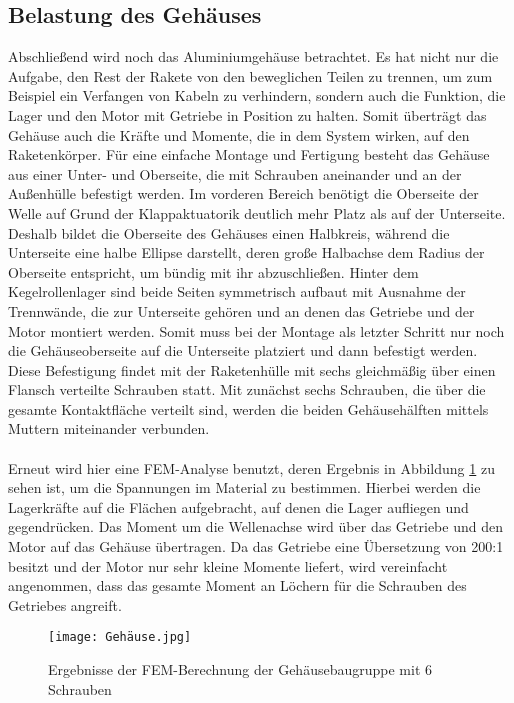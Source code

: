 \subsection{Belastung des Gehäuses}
Abschließend wird noch das Aluminiumgehäuse betrachtet. Es hat nicht nur die Aufgabe, den Rest der Rakete von den beweglichen Teilen zu trennen, um zum Beispiel ein Verfangen von Kabeln zu verhindern, sondern auch die Funktion, die Lager und den Motor mit Getriebe in Position zu halten. Somit überträgt das Gehäuse auch die Kräfte und Momente, die in dem System wirken, auf den Raketenkörper. Für eine einfache Montage und Fertigung besteht das Gehäuse aus einer Unter- und Oberseite, die mit Schrauben aneinander und an der Außenhülle befestigt werden. Im vorderen Bereich benötigt die Oberseite der Welle auf Grund der Klappaktuatorik deutlich mehr Platz als auf der Unterseite. Deshalb bildet die Oberseite des Gehäuses einen Halbkreis, während die Unterseite eine halbe Ellipse darstellt, deren große Halbachse dem Radius der Oberseite entspricht, um bündig mit ihr abzuschließen. Hinter dem Kegelrollenlager sind beide Seiten symmetrisch aufbaut mit Ausnahme der Trennwände, die zur Unterseite gehören und an denen das Getriebe und der Motor montiert werden. Somit muss bei der Montage als letzter Schritt nur noch die Gehäuseoberseite auf die Unterseite platziert und dann befestigt werden.
Diese Befestigung findet mit der Raketenhülle mit sechs gleichmäßig über einen Flansch verteilte Schrauben statt. Mit zunächst sechs Schrauben, die über die gesamte Kontaktfläche verteilt sind, werden die beiden Gehäusehälften mittels Muttern miteinander verbunden.
\\~\\
Erneut wird hier eine FEM-Analyse benutzt, deren Ergebnis in Abbildung \ref{abb_FEM_Gehäuse1} zu sehen ist, um die Spannungen im Material zu bestimmen. Hierbei werden die Lagerkräfte auf die Flächen aufgebracht, auf denen die Lager aufliegen und gegendrücken. Das Moment um die Wellenachse wird über das Getriebe und den Motor auf das Gehäuse übertragen. Da das Getriebe eine Übersetzung von 200:1 besitzt und der Motor nur sehr kleine Momente liefert, wird vereinfacht angenommen, dass das gesamte Moment an Löchern für die Schrauben des Getriebes angreift.
\begin{figure}[h] 
	\centering
	\texttt{[image: Gehäuse.jpg]}
	\caption{Ergebnisse der FEM-Berechnung der Gehäusebaugruppe mit 6 Schrauben}
	\label{abb_FEM_Gehäuse1}
\end{figure}\\
